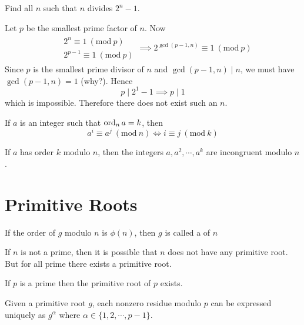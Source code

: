 \documentclass[11pt,numbers=noenddot,svgnames,dvipsnames]{scrartcl}
\renewcommand{\pmod}[1]{\ (\mathrm{mod}\ #1)}
\begin{document}
\begin{example}
    Find all $n$ such that $n$ divides $2^{n} - 1$.
\end{example}
\begin{sol}
    Let $p$ be the smallest prime factor of $n$. Now 
    \begin{align*}
        \begin{matrix}
            & 2^n     \equiv 1 \pmod p \\
            & 2^{p-1} \equiv 1 \pmod p
        \end{matrix} \implies 2^{\gcd(p - 1, n)} \equiv 1 \pmod p
    \end{align*}
    Since $p$ is the smallest prime divisor of $n$ and $\gcd(p - 1, n) \mid n$, 
    we must have $\gcd(p - 1, n) = 1$ (why?). Hence 
    \[
        p \mid 2^1 - 1 \implies p \mid 1
    \]
    which is impossible. Therefore there does not exist such an $n$.
\end{sol}

\begin{theorem}
    If $a$ is an integer such that $\operatorname{ord}_{n} a = k$, then 
    \[
        a^{i} \equiv a^{j} \pmod n \iff i \equiv j \pmod k
    \]
\end{theorem}

\begin{corollary}
    If $a$ has order $k$ modulo $n$, then the integers $a, a^{2}, \cdots, a^{k}$ 
    are incongruent modulo $n$.
\end{corollary}

\section{Primitive Roots}

\begin{definition}
    If the order of $g$ modulo $n$ is $\phi(n)$, then $g$ is called 
    a  of $n$
\end{definition}
If $n$ is not a prime, then it is possible that $n$ does not have any primitive root. 
But for all prime there exists a primitive root.

\begin{theorem}
    If $p$ is a prime then the primitive root of $p$ exists. 
\end{theorem}
\begin{lemma}
    Given a primitive root $g$, each nonzero residue modulo $p$ can be 
    expressed uniquely as $g^{\alpha}$ where $\alpha \in \{1, 2, \cdots, p - 1\}$.
\end{lemma}
\end{document}
